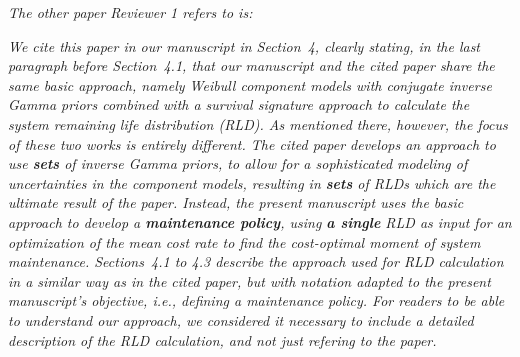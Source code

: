 \documentclass[authoryear]{elsarticle}
\begin{document}
\smallskip

\emph{The other paper Reviewer 1 refers to is:}

\nocite{2016:walter-coolen}


\smallskip

\emph{We cite this paper in our manuscript in Section~4,
clearly stating, in the last paragraph before Section~4.1,
that our manuscript and the cited paper share the same basic approach, namely
Weibull component models with conjugate inverse Gamma priors
combined with a survival signature approach to calculate the system remaining life distribution (RLD).
As mentioned there, however, the focus of these two works is entirely different.
The cited paper develops an approach to use \textbf{sets} of inverse Gamma priors,
to allow for a sophisticated modeling of uncertainties in the component models,
resulting in \textbf{sets} of RLDs which are the ultimate result of the paper.
Instead, the present manuscript uses the basic approach to develop a \textbf{maintenance policy},
using \textbf{a single} RLD as input for an optimization of the mean cost rate to find the cost-optimal moment of system maintenance.
Sections~4.1 to 4.3 describe the approach used for RLD calculation
in a similar way as in the cited paper,
but with notation adapted to the present manuscript's objective, i.e., defining a maintenance policy.
For readers to be able to understand our approach,
we considered it necessary to include a detailed description of the RLD calculation,
and not just refering to the paper.
}

\medskip
\end{document}
